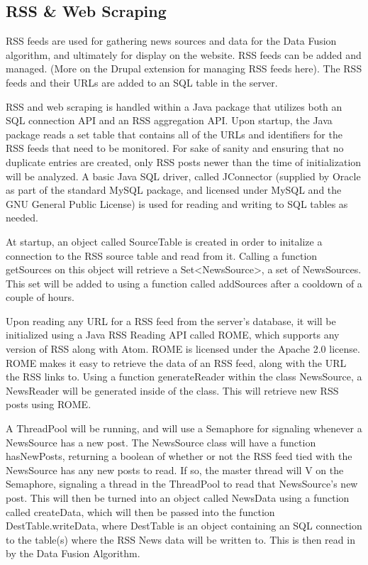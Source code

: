\documentclass[12pt]{article} %
\begin{document}
\subsection{RSS \& Web Scraping}

RSS feeds are used for gathering news sources and data for the Data Fusion algorithm, and ultimately for display on the website. RSS feeds can be added and managed. (More on the Drupal extension for managing RSS feeds here). The RSS feeds and their URLs are added to an SQL table in the server.

RSS and web scraping is handled within a Java package that utilizes both an SQL
connection API and an RSS aggregation API. Upon startup, the Java package reads a
set table that contains all of the URLs and identifiers for the RSS feeds that need to be
monitored. For sake of sanity and ensuring that no duplicate entries are created, only
RSS posts newer than the time of initialization will be analyzed. A basic Java SQL driver,
called JConnector (supplied by Oracle as part of the standard MySQL package, and licensed
under MySQL and the GNU General Public License) is used for reading and writing to SQL
tables as needed.

At startup, an object called SourceTable is created in order to initalize a connection
to the RSS source table and read from it. Calling a function getSources on this object
will retrieve a Set<NewsSource>, a set of NewsSources. This set will be added to using
a function called addSources after a cooldown of a couple of hours.

Upon reading any URL for a RSS feed from the server's database, it will be
initialized using a Java RSS Reading API called ROME, which supports any version of RSS
along with Atom. ROME is licensed under the Apache 2.0 license. ROME makes it easy to
retrieve the data of an RSS feed, along with the URL the RSS links to. Using a function
generateReader within the class NewsSource, a NewsReader will be generated inside of the
class. This will retrieve new RSS posts using ROME.

A ThreadPool will be running, and will use a Semaphore for signaling whenever a NewsSource
has a new post. The NewsSource class will have a function hasNewPosts, returning a boolean
of whether or not the RSS feed tied with the NewsSource has any new posts to read. If so,
the master thread will V on the Semaphore, signaling a thread in the ThreadPool to
read that NewsSource's new post. This will then be turned into an object called NewsData
using a function called createData, which will then be passed into the function
DestTable.writeData, where DestTable is an object containing an SQL connection to the
table(s) where the RSS News data will be written to. This is then read in by the Data
Fusion Algorithm.
\end{document}
